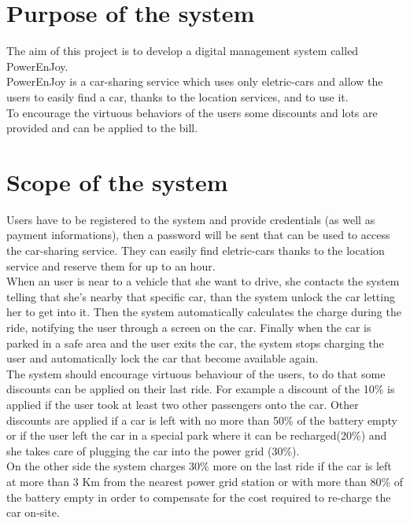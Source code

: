 \section{Purpose of the system}
The aim of this project is to develop a digital management system called PowerEnJoy. 
\\PowerEnJoy is a car-sharing service which uses only eletric-cars and allow the users to easily find a car, thanks to the location services, and to use it. 
\\To encourage the virtuous behaviors of the users some discounts and lots are provided and can be applied to the bill.

\section{Scope of the system}
Users have to be registered to the system and provide credentials (as well as payment informations), then a password will be sent that can be used to access the car-sharing service. 
They can easily find eletric-cars thanks to the location service and reserve them for up to an hour. 
\\When an user is near to a vehicle that she want to drive, she contacts the system telling that she's nearby that specific car, than the system unlock the car letting her to get into it. 
Then the system automatically calculates the charge during the ride, notifying the user through a screen on the car. 
Finally when the car is parked in a safe area and the user exits the car, the system stops charging the user and automatically lock the car that become available again.
\\The system should encourage virtuous behaviour of the users, %
to do that some discounts can be applied on their last ride. For example a discount of the 10\% is applied if the user took at least two other passengers onto the car. 
Other discounts are applied if a car is left with no more than 50\% of the battery empty or if the user left the car in a special park where it can be recharged(20\%) 
and she takes care of plugging the car into the power grid (30\%). 
\\On the other side the system charges 30\% more on the last ride if the car is left at more than 3 Km from the nearest power grid station or with more than 80\% of the battery empty in order to compensate for the cost required to re-charge the car on-site.

